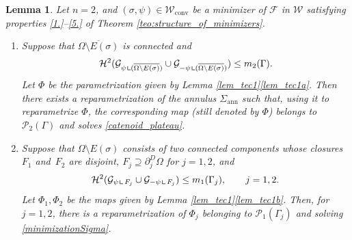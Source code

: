 \documentclass[JEP,XML,SOM,Unicode, NoFloatCountersInSection,published]{cedram}
\let\Om\Omega
\newcommand\admclassconv{{\mathcal W_\mathrm{conv}}}
\newcommand{\openannulus}{\Sigma_\mathrm{ann}}
\newcommand{\resa}{\mathop{\hbox{\vrule height 7pt width 0.5pt depth 0pt
\vrule height 0.5pt width 6pt depth 0pt}}\nolimits}
\newcommand{\resb}{\mathop{\hbox{\vrule height 4pt width 0.5pt depth 0pt
\vrule height 0.5pt width 3pt depth 0pt}}\nolimits}
\newcommand{\res}{\mathchoice{\resa}{\resa}{\resb}{\resb}}
\newtheorem{lemma}[theorem]{Lemma}
\theoremstyle{definition}
\begin{document}
\begin{lemma}\label{lem_tec2}
Let $n=2$, and $(\sigma,\psi)\in\admclassconv$ be a minimizer of
$\mathcal F$ in
$\mathcal W$
satisfying properties \ref{1.}--\ref{5.} of Theorem \ref{teo:structure_of_minimizers}.
\begin{enumerate}[{\rm(a)},wide]
\item\label{lem_tec2a}
Suppose that $\overline{\Om\setminus E(\sigma)}$ is connected and
\begin{equation}\label{eq:lem_tec2}
\mathcal H^2(\mathcal G_{\psi\res (\overline{\Om\setminus E(\sigma)})}\cup\mathcal G_{-\psi\res (\overline{\Om\setminus E(\sigma)})})\leq m_2(\Gamma).
\end{equation}
Let $\Phi$ be the parametrization given by Lemma \ref{lem_tec1}\ref{lem_tec1a}.
Then there exists a reparametrization of the annulus $\openannulus$
such that, using it to reparametrize $\Phi$, the corresponding map (still denoted by $\Phi$)
belongs to $\mathcal P_2(\Gamma)$ and solves \eqref{catenoid_plateau}.
\item\label{lem_tec2b}
Suppose that $\Om\setminus E(\sigma)$
consists of two connected components whose closures~$F_1$ and~$F_2$ are disjoint,
$F_j \supseteq \partial_j^D \Om$ for $j=1,2$, and
\[
\mathcal H^2(\mathcal G_{\psi\res {F_j}}
\cup\mathcal G_{-\psi\res {F_j}})\leq m_1(\Gamma_j),
\qquad j=1,2.
\]
Let $\Phi_1,\Phi_2$ be the maps given by Lemma \ref{lem_tec1}\ref{lem_tec1b}. Then, for $j=1,2$, there is a reparametrization
of $\Phi_j$ belonging to $\mathcal P_1(\Gamma_j)$ and solving \eqref{minimizationSigma}.
\end{enumerate}
\end{lemma}
\end{document}
